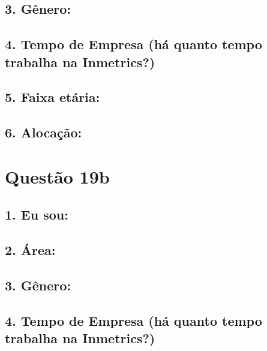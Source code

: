 \documentclass[]{book}
\begin{document}
\hypertarget{genero-45}{%
\subsection{3. Gênero:}\label{genero-45}}

\hypertarget{tempo-de-empresa-ha-quanto-tempo-trabalha-na-inmetrics-45}{%
\subsection{4. Tempo de Empresa (há quanto tempo trabalha na Inmetrics?)}\label{tempo-de-empresa-ha-quanto-tempo-trabalha-na-inmetrics-45}}

\hypertarget{faixa-etaria-45}{%
\subsection{5. Faixa etária:}\label{faixa-etaria-45}}

\hypertarget{alocacao-45}{%
\subsection{6. Alocação:}\label{alocacao-45}}

\hypertarget{questao-19b}{%
\section{Questão 19b}\label{questao-19b}}

\hypertarget{eu-sou-46}{%
\subsection{1. Eu sou:}\label{eu-sou-46}}

\hypertarget{area-46}{%
\subsection{2. Área:}\label{area-46}}

\hypertarget{genero-46}{%
\subsection{3. Gênero:}\label{genero-46}}

\hypertarget{tempo-de-empresa-ha-quanto-tempo-trabalha-na-inmetrics-46}{%
\subsection{4. Tempo de Empresa (há quanto tempo trabalha na Inmetrics?)}\label{tempo-de-empresa-ha-quanto-tempo-trabalha-na-inmetrics-46}}
\end{document}
